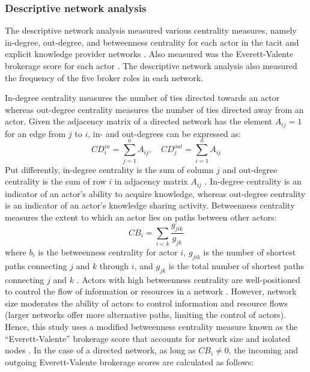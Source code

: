 \subsubsection{Descriptive network analysis} \label{sss:descriptive_network_analysis}

The descriptive network analysis measured various centrality measures, namely in-degree, out-degree, and betweenness centrality for each actor in the tacit and explicit knowledge provider networks \citep{freeman1979centrality}. Also measured was the Everett-Valente brokerage score for each actor \citep{everett2016bridging}. The descriptive network analysis also measured the frequency of the five \citet{gould1989structures} broker roles in each network. \medskip 

In-degree centrality measures the number of ties directed towards an actor whereas out-degree centrality measures the number of ties directed away from an actor. Given the adjacency matrix of a directed network has the element $A_{ij} = 1$ for an edge from $j$ to $i$, in- and out-degrees can be expressed as: $$CD_i^{in} = \sum_{j = 1}^nA_{ij}, \,\,\,\,\,\, CD_j^{out} = \sum_{i = 1}^nA_{ij}$$ \noindent Put differently, in-degree centrality is the sum of column $j$ and out\hyp{}degree centrality is the sum of row $i$ in adjacency matrix $A_{ij}$ \citep{newman2010networks}. In-degree centrality is an indicator of an actor's ability to acquire knowledge, whereas out-degree centrality is an indicator of an actor's knowledge sharing activity. Betweenness centrality measures the extent to which an actor lies on paths between other actors: $$ CB_i=\sum_{i < k}\frac{g_{jik}}{g_{jk}} $$ where $b_i$ is the betweenness centrality for actor $i$, $g_{jik}$ is the number of shortest paths connecting $j$ and $k$ through $i$, and $g_{jk}$ is the total number of shortest paths connecting $j$ and $k$ \citep{freeman1979centrality}. Actors with high betweenness centrality are well\hyp{}positioned to control the flow of information or resources in a network \citep{everett2016bridging}. However, network size moderates the ability of actors to control information and resource flows (larger networks offer more alternative paths, limiting the control of actors). Hence, this study uses a modified betweenness centrality measure known as the \enquote{Everett-Valente} brokerage score that accounts for network size and isolated nodes \citep{everett2016bridging}. In the case of a directed network, as long as $CB_i \neq 0$, the incoming and outgoing Everett-Valente brokerage scores are calculated as follows: \medskip


